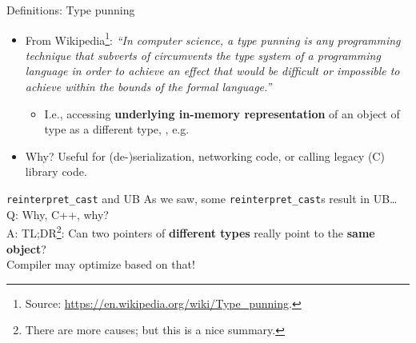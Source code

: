 \begin{frame}{Definitions: Type punning}
  \begin{itemize}
  \item From Wikipedia\footnote{Source: \url{https://en.wikipedia.org/wiki/Type_punning}.}: \textit{``In computer science, a type punning is any programming technique that subverts of circumvents the type system of a programming language in order to achieve an effect that would be difficult or impossible to achieve within the bounds of the formal language.''}
    \begin{itemize}
    \item I.e., accessing \textbf{underlying in-memory representation} of an object of type  as a different type, , e.g.\\[1ex]
      
    \end{itemize}
    \bigskip
    \bigskip

  \item \alert{Why?} Useful for (de-)serialization, networking code, or calling legacy (C) library code.
  \end{itemize}
\end{frame}

\begin{frame}{\texttt{reinterpret\_cast} and UB}
  As we saw, some \texttt{reinterpret\_cast}s result in UB\ldots\\[2em]

  Q: Why, C++, why?~\worried\\
  \pause
  A: TL;DR\footnote{There are more causes; but this is a nice summary.}: Can two pointers of \textbf{different types} really point to the \textbf{same object}?\\
  Compiler may optimize based on that!
\end{frame}
